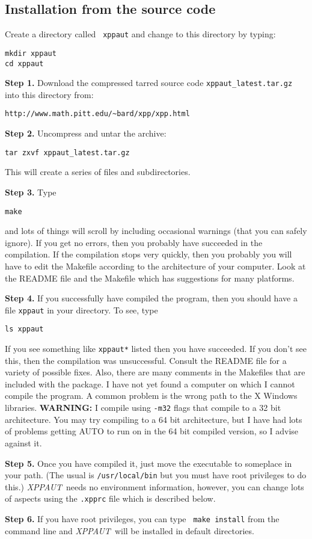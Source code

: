 \documentclass{article}
\newcommand{\XPP}{{\sl XPPAUT\, }}
\begin{document}
\subsection{Installation from the source code}
\begin{description}
\item Create a directory called {\tt
xppaut} and change to this directory by typing:
\begin{verbatim}
mkdir xppaut
cd xppaut
\end{verbatim}
\item{\bf Step 1.} Download the compressed tarred
source code {\tt xppaut\_latest.tar.gz} into this directory
 from:
\begin{verbatim}
http://www.math.pitt.edu/~bard/xpp/xpp.html
\end{verbatim}

\item{\bf Step 2.} Uncompress and untar the archive:
\begin{verbatim}
tar zxvf xppaut_latest.tar.gz
\end{verbatim}
This will create a series of files and subdirectories.
\item{\bf Step 3.}  Type
\begin{verbatim}
make
\end{verbatim}
and lots of things will scroll by including occasional warnings (that
you
can safely ignore).  If you get no errors, then you probably have
succeeded in the compilation. If the compilation stops very quickly,
then you probably you will have to edit the Makefile according to the
architecture of your computer.  Look at the README file and the
Makefile which has suggestions for many platforms. 
\item{\bf Step 4.} If you successfully have compiled the program, then
you should have a
file {\tt xppaut} in your directory. To see, type
\begin{verbatim}
ls xppaut
\end{verbatim}
If you see something like {\tt xppaut*} listed then you have
succeeded. If you don't see this, then the compilation was
unsuccessful. Consult the README file for a variety of possible
fixes. Also, there are many comments in the Makefiles that are
included with the package. 
I have not yet found a computer on which I cannot compile the
program. A common problem is the wrong path to the X Windows
libraries. {\bf WARNING:} I compile using {\tt -m32} flags that
compile to a 32 bit architecture. You may try compiling to a 64 bit
architecture, but I have had lots of problems getting AUTO to run on
in the 64 bit compiled version, so I advise against it. 
\item{\bf Step 5.} Once you have
compiled it, just move the executable to someplace in your path. (The
usual is {\tt /usr/local/bin} but you must have root privileges to do
this.) \XPP needs no environment information, however, you can change
lots of aspects using the  {\tt .xpprc} file which is described below. 
\item {\bf Step 6.}  If you have root privileges, you can type {\tt
make install} from the command line and \XPP will be installed in
default directories. 
\end{description}
\end{document}
